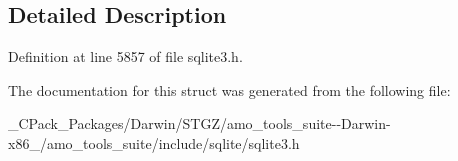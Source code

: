 \subsection{Detailed Description}


Definition at line 5857 of file sqlite3.\+h.



The documentation for this struct was generated from the following file\+:\begin{DoxyCompactItemize}
\item 
\+\_\+\+C\+Pack\+\_\+\+Packages/\+Darwin/\+S\+T\+G\+Z/amo\+\_\+tools\+\_\+suite-\/-\/\+Darwin-\/x86\+\_/amo\+\_\+tools\+\_\+suite/include/sqlite/sqlite3.\+h\end{DoxyCompactItemize}
